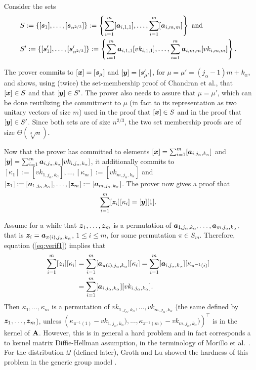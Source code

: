Consider the sets
\begin{align*}
&S:=\{[{\boldsymbol{s}}_1],\ldots,[{\boldsymbol{s}}_{n^{2/3}}]\}:=\left\{\sum_{i=1}^{m}[{\boldsymbol{a}}_{i,1,1}],\ldots,\sum_{i=1}^{m}[{\boldsymbol{a}}_{i,m,m}]\right\}\text{ and }\\
&S':=\{[{\boldsymbol{s}}'_1],\ldots,[{\boldsymbol{s}}'_{n^{2/3}}]\}:=\left\{\sum_{i=1}^{m}{\boldsymbol{a}}_{i,1,1}[vk_{i,1,1}],\ldots,\sum_{i=1}^{m}{\boldsymbol{a}}_{i,m,m}[vk_{i,m,m}]\right\}.
\end{align*}

The prover commits to $[{\boldsymbol{x}}]=[{\boldsymbol{s}}_\mu]$ and $[{\boldsymbol{y}}]=[{\boldsymbol{s}}'_{\mu'}]$, for $\mu=\mu'=(j_\alpha-1)m+k_\alpha$, and shows, using (twice) the set-membership proof of Chandran et al., that $[{\boldsymbol{x}}]\in S$ and that $[{\boldsymbol{y}}]\in S'$.
The prover also needs to assure that $\mu=\mu'$, which can be done reutilizing the commitment to $\mu$ (in fact to its representation as two unitary vectors of size $m$) used in the proof that $[{\boldsymbol{x}}]\in S$ and in the proof that $[{\boldsymbol{y}}]\in S'$. Since both sets are of size $n^{2/3}$, the two set membership proofs are of size $\Theta(\sqrt[3]{n})$.
 
Now that the prover has committed to elements $[{\boldsymbol{x}}]=\sum_{i=1}^{m}[{\boldsymbol{a}}_{i,j_\alpha,k_\alpha}]$ and $[{\boldsymbol{y}}]=\sum_{i=1}^{m}{\boldsymbol{a}}_{i,j_\alpha,k_\alpha}[vk_{i,j_\alpha,k_\alpha}]$, it additionally commits to $[\kappa_1]:=[vk_{1,j_\alpha,k_\alpha}],\allowbreak\ldots,\allowbreak[\kappa_m]:=[vk_{m,j_\alpha,k_\alpha}]$ and $[{\boldsymbol{z}}_1]:=[{\boldsymbol{a}}_{1,j_\alpha,k_\alpha}],\ldots,[{\boldsymbol{z}}_m]:=[{\boldsymbol{a}}_{m,j_\alpha,k_\alpha}]$. The prover now gives a proof that
\begin{equation}
\sum_{i=1}^{m}[{\boldsymbol{z}}_i][\kappa_i]=[{\boldsymbol{y}}][1]. \label{eq:verif1}
\end{equation}

Assume for a while that ${\boldsymbol{z}}_1,\ldots,{\boldsymbol{z}}_m$ is a permutation of ${\boldsymbol{a}}_{1,j_\alpha,k_\alpha},\ldots,{\boldsymbol{a}}_{m,j_\alpha,k_\alpha}$, that is ${\boldsymbol{z}}_i={\boldsymbol{a}}_{\pi(i),j_\alpha,k_\alpha}$, $1\leq i\leq m$, for some permutation $\pi\in S_m$. Therefore, equation (\ref{eq:verif1}) implies that
\begin{align*}
\sum_{i=1}^{m}[{\boldsymbol{z}}_i][\kappa_i]&=\sum_{i=1}^{m}[{\boldsymbol{a}}_{\pi(i),j_\alpha,k_\alpha}][\kappa_i]=\sum_{i=1}^{m}[{\boldsymbol{a}}_{i,j_\alpha,k_\alpha}][\kappa_{\pi^{-1}(i)}]\\
&=\sum_{i=1}^{m}[{\boldsymbol{a}}_{i,j_\alpha,k_\alpha}][vk_{i,j_\alpha,k_\alpha}].
\end{align*}
Then $\kappa_1,\ldots,\kappa_m$ is a permutation of $vk_{1,j_\alpha,k_\alpha},\ldots,vk_{m,j_\alpha,k_\alpha}$ (the same defined by ${\boldsymbol{z}}_1,\ldots,{\boldsymbol{z}}_m$), unless $(\kappa_{\pi^{-1}(1)}-{vk_{1,j_\alpha,k_\alpha}),\ldots,\kappa_{\pi^{-1}(m)}-vk_{m,j_\alpha,k_\alpha})})^\top$ is in the kernel of $\mathbf{{A}}$. However, this is in general a hard problem and in fact corresponds a to kernel matrix Diffie-Hellman assumption, in the terminology of Morillo et al.~\cite{AC:MorRafVil16}.
For the distribution $\mathcal{Q}$ (defined later), Groth and Lu showed the hardness of this problem in the generic group model \cite{AC:GroLu07}.

